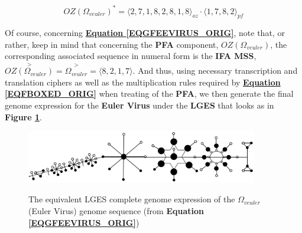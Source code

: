 \documentclass[a4paper, 18pt]{book} %
\begin{document}
\begin{appendices}
\begin{equation}
\label{EQGFEEVIRUS_ORIG}
\boxed{OZ(\Omega_{veuler})}^* =  \langle 2,7,1,8,2,8,1,8 \rangle_{oz}\cdot\boxed{\langle 1, 7, 8, 2 \rangle}_{pf}
\end{equation}

Of course, concerning \textbf{\hyperref[EQGFEEVIRUS_ORIG]{Equation \ref{EQGFEEVIRUS_ORIG}}}, note that, or rather, keep in mind that concerning the \textbf{PFA} component, $\boxed{OZ(\Omega_{veuler})}$, the corresponding associated sequence in numeral form is the \textbf{IFA MSS}, $\overset{>}{OZ(\Omega_{veuler})} = \overset{>}{\Omega_{veuler}} = \langle 8, 2, 1, 7 \rangle$. And thus, using necessary transcription and translation ciphers as well as the multiplication rules required by \textbf{\hyperref[EQFBOXED_ORIG]{Equation \ref{EQFBOXED_ORIG}}} when treating of the \textbf{PFA}, we then generate the final genome expression for the \textbf{Euler Virus} under the \textbf{LGES} that looks as in \textbf{Figure \ref{FIGLGESEULERVIRUS_ORIG}}.


\begin{figure}[H]
  \begin{center}
   \includegraphics[trim=0cm 0cm 0cm 0cm, clip, width=0.9\textwidth,]{resources/pdfs/PLATONIC-EULERVIRUS-landscape_ORIG.pdf}\\
   \caption{The equivalent LGES complete genome expression of the $\Omega_{veuler}$ (Euler Virus) genome sequence (from \textbf{Equation \ref{EQGFEEVIRUS_ORIG}})}
  \label{FIGLGESEULERVIRUS_ORIG}
  \end{center}
\end{figure}



\end{appendices}
\end{document}

